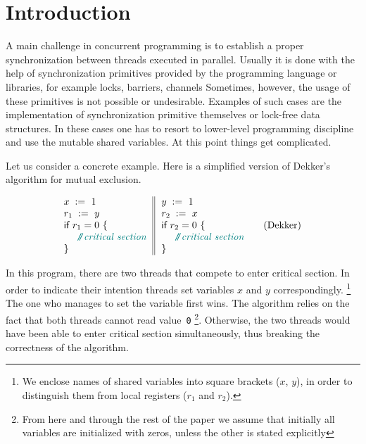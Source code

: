 \section{Introduction}
\label{sec:intro}

A main challenge in concurrent programming is 
to establish a proper synchronization between threads executed in parallel.     
Usually it is done with the help of synchronization primitives
provided by the programming language or libraries,
for example locks, barriers, channels \etc
Sometimes, however, the usage of these primitives
is not possible or undesirable. 
Examples of such cases are the implementation 
of synchronization primitive themselves
or lock-free data structures.
In these cases one has to resort to 
lower-level programming discipline and 
use the mutable shared variables. 
At this point things get complicated.


Let us consider a concrete example.
Here is a simplified version of Dekker's algorithm for mutual exclusion.

\begin{equation*}
\inarrII{
  \writeInst{}{x}{1} \\
  \readInst{}{r_1}{y}  \\
  \kw{if} {r_1 = 0} ~\{ \\
  ~~ \comment{critical section} \\
  \}
}{
  \writeInst{}{y}{1} \\
  \readInst{}{r_2}{x}  \\
  \kw{if} {r_2 = 0} ~\{ \\
  ~~ \comment{critical section} \\
  \}
}
\tag{Dekker}\label{ex:Dekker}
\end{equation*}

In this program, there are two threads that compete to enter critical section.
In order to indicate their intention threads set 
variables $x$ and $y$ correspondingly.%
\footnote{We enclose names of shared variables into square brackets
(\ie $x$, $y$), in order to distinguish them 
from local registers (\ie $r_1$ and $r_2$).}
The one who manages to set the variable first wins.
The algorithm relies on the fact that both threads cannot read value~\texttt{0}%
\footnote{From here and through the rest of the paper we assume that initially all 
variables are initialized with zeros, unless the other is stated explicitly}.
Otherwise, the two threads would have been able 
to enter critical section simultaneously, 
thus breaking the correctness of the algorithm.

